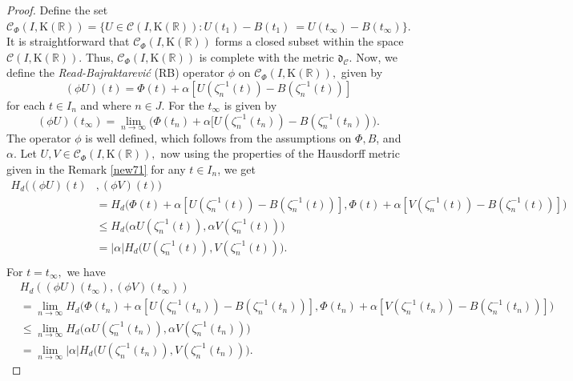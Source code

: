 \documentclass[12pt,oneside,reqno]{amsart}
\theoremstyle{definition}
\theoremstyle{remark}
\begin{document}
   \begin{proof}
    Define the set $ \mathcal{C}_\Phi(I,\mathrm{K}( \mathbb{R}))= \{ U \in \mathcal{C}(I,\mathrm{K}( \mathbb{R})): U(t_1)-B(t_1)~= U(t_\infty)-B(t_\infty)\}.$ It is straightforward that $\mathcal{C}_\Phi(I,\mathrm{K}( \mathbb{R}))$ forms a closed subset within the space $\mathcal{C}(I,\mathrm{K}( \mathbb{R})).$  Thus, $ \mathcal{C}_\Phi(I,\mathrm{K}( \mathbb{R}))$ is  complete with the  metric $\mathfrak{d}_{\mathcal{C}}.$
   Now, we define the  \textit{Read-Bajraktarevi\'c }(RB) operator $\phi$ on $ \mathcal{C}_\Phi( I, \mathrm{K}( \mathbb{R}) )  ,$ given by 
   \[(\phi U)(t)= \Phi(t) + \alpha  [U(\zeta_n^{-1}(t)) - B(\zeta_n^{-1}(t))]\]
   for each $t \in I_n $ and where $n \in J $. For the $t_\infty$ is given by \[ (\phi U)(t_\infty)=\underset{n \rightarrow \infty}{\lim} \Big(\Phi(t_n) + \alpha  [U(\zeta_n^{-1}(t_n)) - B(\zeta_n^{-1}(t_n))\Big) .\]
   The operator $\phi$ is well defined, which follows from the assumptions on  $\Phi,B$, and $\alpha$. Let $U,V \in \mathcal{C}_\Phi( I, \mathrm{K}( \mathbb{R}) ) ,$  now using the properties of the Hausdorff metric given in the  Remark \ref{new71} for any $t\in I_n$, we get 
   \begin{align*}
     H_d((\phi U)(t)&,(\phi V)(t))\\
&= H_d\Big(\Phi(t) + \alpha  [U(\zeta_n^{-1}(t)) - B(\zeta_n^{-1}(t))],\Phi(t) + \alpha  [V(\zeta_n^{-1}(t))-B(\zeta_n^{-1}(t))]\Big)\\
     &\leq H_d\Big( \alpha U(\zeta_n^{-1}(t)),\alpha V(\zeta_n^{-1}(t))\Big)\\
     &=\lvert \alpha \rvert H_d\Big(  U(\zeta_n^{-1}(t)), V(\zeta_n^{-1}(t))\Big).\\
   \end{align*}
   For $t=t_\infty,$ we have
   \begin{align*}
        &H_d((\phi U)(t_\infty),(\phi V)(t_\infty))\\ &=\underset{n \rightarrow\infty}{\lim}H_d\Big(\Phi(t_n) + \alpha  [U(\zeta_n^{-1}(t_n)) - B(\zeta_n^{-1}(t_n))],\Phi(t_n) + \alpha  [V(\zeta_n^{-1}(t_n))-B(\zeta_n^{-1}(t_n))]\Big)\\ &\le \underset{n \rightarrow\infty}{\lim}H_d\Big( \alpha U(\zeta_n^{-1}(t_n)),\alpha V(\zeta_n^{-1}(t_n))\Big)\\  & = \underset{n \rightarrow\infty}{\lim}  \lvert \alpha \rvert H_d\Big(  U(\zeta_n^{-1}(t_n)), V(\zeta_n^{-1}(t_n))\Big).

\end{align*}
\end{proof}
\end{document}
